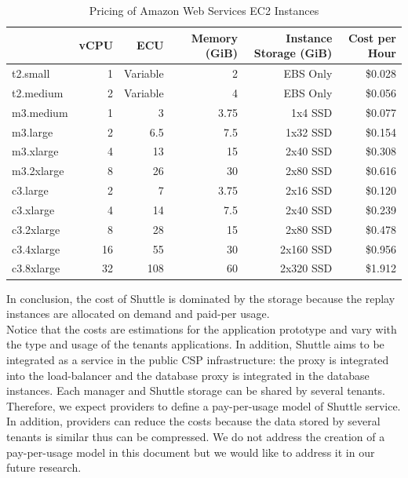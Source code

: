 \begin{table}
  \centering
   \begin{tabular}{|l|r|r|r|r|r|}
\hline
            & \bf{vCPU} & \bf{ECU}    & \bf{Memory (GiB)}  & \bf{Instance Storage (GiB)}  & \bf{Cost per Hour } \\ \hline
t2.small    & 1         & Variable    & 2                  & EBS Only                     & \$0.028            \\ \hline
t2.medium   & 2         & Variable    & 4                  & EBS Only                     & \$0.056            \\ \hline
m3.medium   & 1         & 3           & 3.75               & 1x4 SSD                      & \$0.077            \\ \hline
m3.large    & 2         & 6.5         & 7.5                & 1x32 SSD                     & \$0.154            \\ \hline
m3.xlarge   & 4         & 13          & 15                 & 2x40 SSD                     & \$0.308            \\ \hline
m3.2xlarge  & 8         & 26          & 30                 & 2x80 SSD                     & \$0.616            \\ \hline
c3.large    & 2         & 7           & 3.75               & 2x16 SSD                     & \$0.120            \\ \hline
c3.xlarge   & 4         & 14          & 7.5                & 2x40 SSD                     & \$0.239            \\ \hline
c3.2xlarge  & 8         & 28          & 15                 & 2x80 SSD                     & \$0.478            \\ \hline
c3.4xlarge  & 16        & 55          & 30                 & 2x160 SSD                    & \$0.956            \\ \hline
c3.8xlarge  & 32        & 108         & 60                 & 2x320 SSD                    & \$1.912            \\ \hline
\end{tabular}
\caption{Pricing of Amazon Web Services \ac{EC2} Instances }
\label{tab:ec2Cost}
\end{table}

In conclusion, the cost of Shuttle is dominated by the storage because the replay instances are allocated on demand and paid-per usage.\\

Notice that the costs are estimations for the application prototype and vary with the type and usage of the tenants applications. In addition, Shuttle aims to be integrated as a service in the public \ac{CSP} infrastructure: the proxy is integrated into the load-balancer and the database proxy is integrated in the database instances. Each manager and Shuttle storage can be shared by several tenants. Therefore, we expect providers to define a pay-per-usage model of Shuttle service. In addition, providers can reduce the costs because the data stored by several tenants is similar thus can be compressed. We do not address the creation of a pay-per-usage model in this document but we would like to address it in our future research.

